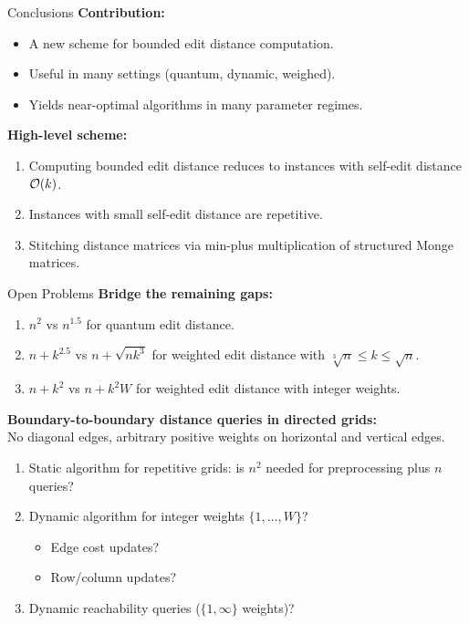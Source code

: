 \documentclass[sans-serif,aspectratio=169]{beamer}
\begin{document}
\begin{frame}{Conclusions}
    \textbf{Contribution:}
    \begin{itemize}
        \item A new scheme for bounded edit distance computation.
        \item Useful in many settings (quantum, dynamic, weighed).
        \item Yields near-optimal algorithms in many parameter regimes.
    \end{itemize}

    \bigskip
    \pause
    \textbf{High-level scheme:}
    \begin{enumerate}
        \item Computing bounded edit distance reduces to instances with self-edit distance $\mathcal{O}(k)$.
        \item Instances with small self-edit distance are repetitive.
        \item Stitching distance matrices via min-plus multiplication of structured Monge matrices.
    \end{enumerate}

\end{frame}


\begin{frame}{Open Problems}
    \textbf{Bridge the remaining gaps:}
    \begin{enumerate}
        \item $n^2$ vs $n^{1.5}$ for quantum edit distance.
        \item $n+k^{2.5}$ vs $n+\sqrt{nk^3}$ for weighted edit distance with $\sqrt[3]{n} \le k \le \sqrt{n}$.
        \item $n+k^2$ vs $n+k^2W$ for weighted edit distance with integer weights.
    \end{enumerate}

    \bigskip
    \bigskip
    \bigskip
    \pause
    \textbf{Boundary-to-boundary distance queries in directed grids:}\\
    {\footnotesize \hfill No diagonal edges, arbitrary positive weights on horizontal and vertical edges.}
    \begin{enumerate}
        \item Static algorithm for repetitive grids: is $n^2$ needed for preprocessing plus $n$ queries?
        \item Dynamic algorithm for integer weights $\{1,\ldots,W\}$? 
        \begin{itemize}
            \item Edge cost updates?
            \item Row/column updates?
        \end{itemize}
        \item Dynamic reachability queries ($\{1,\infty\}$ weights)?
    \end{enumerate}


\end{frame}
\end{document}
